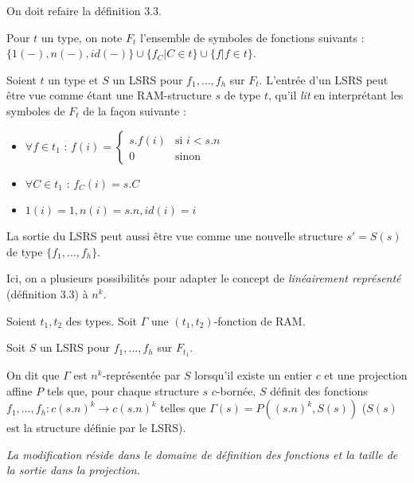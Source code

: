 \documentclass{article}
\begin{document}
		On doit refaire la définition 3.3.
		
		Pour $t$ un type, on note $F_t$ l'ensemble de symboles de fonctions suivants : $\{1(-), n(-), id(-)\} \cup  \{ f_C | C \in t\} \cup \{ f | f \in t\}$.
		
		\begin{remark}
			Soient $t$ un type et $S$ un LSRS pour $f_1, \dots, f_h$ sur $F_{t}$. 
			L'entrée d'un LSRS peut être vue comme étant une RAM-structure $s$ de type $t$, qu'il \emph{lit} en interprétant les symboles de $F_t$ de la façon suivante : 
			
			\begin{itemize}[itemsep=-1mm]
				\item 	$\forall f \in t_1$ :   $f(i) = 
				\left\lbrace \begin{array}{ll}
				s.f(i) & \text{si } i< s.n \\
				0 & \text{sinon}
				\end{array}\right.$
				
				\item 	$\forall C \in t_1$ :   $f_C(i) = s.C$
				\item 	$1(i) = 1, n(i) = s.n, id(i) = i$
			\end{itemize}
			
			La sortie du LSRS peut aussi être vue comme une nouvelle structure $s' = S(s)$ de type $\{f_1, \dots, f_h\}$.
		\end{remark}
		
		
		Ici, on a plusieurs possibilités pour adapter le concept de \emph{linéairement représenté} (définition 3.3) à $n^k$.
		
		\begin{definition}
			Soient $t_1, t_2$ des types. Soit $\Gamma$ une $(t_1, t_2)$-fonction de RAM. 
			
			Soit $S$ un LSRS pour $f_1, \dots, f_h$ sur $F_{t_1}$. 
			
			On dit que $\Gamma$ est $n^k$-représentée par $S$ lorsqu'il existe un entier $c$ et une projection affine $P$ tels que, pour chaque structure $s$ $c$-bornée, $S$ définit des fonctions $f_1, \dots, f_h : c (s.n)^k \to c (s.n)^k$ telles que $\Gamma(s) = P((s.n)^k, S(s))$ ($S(s)$ est la structure définie par le LSRS).
			
			\emph{La modification réside dans le domaine de définition des fonctions et la taille de la sortie dans la projection.}
		\end{definition}
			
\end{document}
